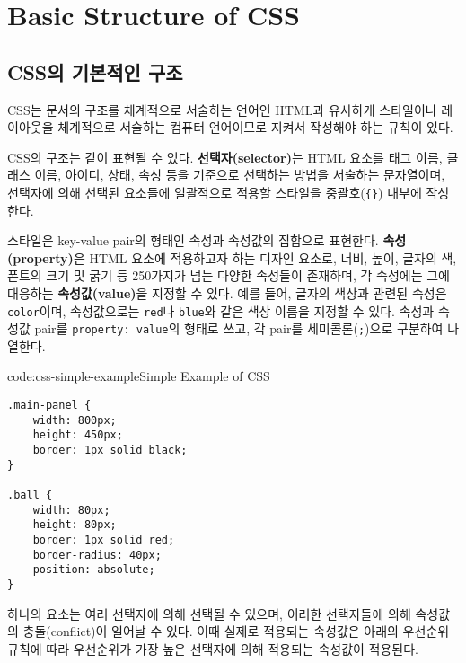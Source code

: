 \section{Basic Structure of CSS} \label{sect:basic-structure-of-css}

\subsection*{CSS의 기본적인 구조}

CSS는 문서의 구조를 체계적으로 서술하는 언어인 HTML과 유사하게 스타일이나 레이아웃을 체계적으로 서술하는 컴퓨터 언어이므로 지켜서 작성해야 하는 규칙이 있다.

    {}

CSS의 구조는 \와 같이 표현될 수 있다. \textbf{선택자(selector)}는 HTML 요소를 태그 이름, 클래스 이름, 아이디, 상태, 속성 등을 기준으로 선택하는 방법을 서술하는 문자열이며, 선택자에 의해 선택된 요소들에 일괄적으로 적용할 스타일을 중괄호(\texttt{\{\}}) 내부에 작성한다.

스타일은 key-value pair의 형태인 속성과 속성값의 집합으로 표현한다. \textbf{속성(property)}은 HTML 요소에 적용하고자 하는 디자인 요소로, 너비, 높이, 글자의 색, 폰트의 크기 및 굵기 등 250가지가 넘는 다양한 속성들이 존재하며, 각 속성에는 그에 대응하는 \textbf{속성값(value)}을 지정할 수 있다. 예를 들어, 글자의 색상과 관련된 속성은 \texttt{color}이며, 속성값으로는 \texttt{red}나 \texttt{blue}와 같은 색상 이름을 지정할 수 있다. 속성과 속성값 pair를 \texttt{property: value}의 형태로 쓰고, 각 pair를 세미콜론(\texttt{;})으로 구분하여 나열한다.

\begin{codeenv}{code:css-simple-example}{Simple Example of CSS}\begin{verbatim}
.main-panel {
    width: 800px;
    height: 450px;
    border: 1px solid black;
}

.ball {
    width: 80px;
    height: 80px;
    border: 1px solid red;
    border-radius: 40px;
    position: absolute;
}
\end{verbatim}
\end{codeenv}

하나의 요소는 여러 선택자에 의해 선택될 수 있으며, 이러한 선택자들에 의해 속성값의 충돌(conflict)이 일어날 수 있다. 이때 실제로 적용되는 속성값은 아래의 우선순위 규칙에 따라 우선순위가 가장 높은 선택자에 의해 적용되는 속성값이 적용된다.

